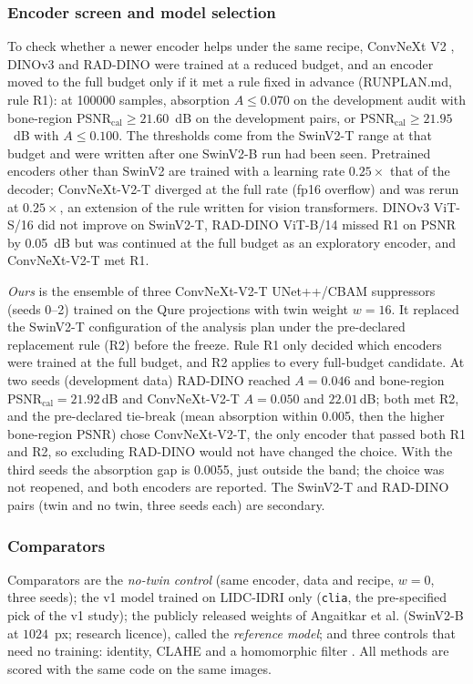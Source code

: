 \subsubsection{Encoder screen and model selection}
\label{sec:m-encoders}
To check whether a newer encoder helps under the same recipe, ConvNeXt V2 \cite{woo2023convnextv2}, DINOv3 \cite{simeoni2025dinov3} and
RAD-DINO \cite{perezgarcia2025raddino} were trained at a reduced budget, and an encoder moved to the full budget only if it met a rule fixed
in advance (RUNPLAN.md, rule R1): at \num{100000} samples, absorption $A\le0.070$ on the development audit with bone-region
PSNR$_{\mathrm{cal}}\ge21.60$~dB on the development pairs, or PSNR$_{\mathrm{cal}}\ge21.95$~dB with $A\le0.100$. The thresholds come from
the SwinV2-T range at that budget and were written after one SwinV2-B run had been seen. Pretrained encoders other than SwinV2 are trained
with a learning rate $0.25\times$ that of the decoder; ConvNeXt-V2-T diverged at the full rate (fp16 overflow) and was rerun at $0.25\times$,
an extension of the rule written for vision transformers. DINOv3 ViT-S/16 did not improve on SwinV2-T, RAD-DINO ViT-B/14 missed R1 on PSNR
by 0.05~dB but was continued at the full budget as an exploratory encoder, and ConvNeXt-V2-T met R1.

\emph{Ours} is the ensemble of three ConvNeXt-V2-T UNet++/CBAM suppressors (seeds 0--2) trained on the Qure projections with twin weight
$w=16$. It replaced the SwinV2-T configuration of the analysis plan under the pre-declared replacement rule (R2) before the freeze. Rule R1
only decided which encoders were trained at the full budget, and R2 applies to every full-budget candidate. At two seeds (development data)
RAD-DINO reached $A=0.046$ and bone-region PSNR$_{\mathrm{cal}}=21.92$\,dB and ConvNeXt-V2-T $A=0.050$ and $22.01$\,dB; both met R2, and
the pre-declared tie-break (mean absorption within 0.005, then the higher bone-region PSNR) chose ConvNeXt-V2-T, the only encoder that
passed both R1 and R2, so excluding RAD-DINO would not have changed the choice. With the third seeds the absorption gap is 0.0055, just
outside the band; the choice was not reopened, and both encoders are reported. The SwinV2-T and RAD-DINO pairs (twin and no twin, three
seeds each) are secondary.

\subsubsection{Comparators}
Comparators are the \emph{no-twin control} (same encoder, data and recipe, $w=0$, three seeds); the v1 model trained on LIDC-IDRI only
(\texttt{clia}, the pre-specified pick of the v1 study); the publicly released weights of Angaitkar et al. \cite{angaitkar2026anatomy}
(SwinV2-B at $1024$~px; research licence), called the \emph{reference model}; and three controls that need no training: identity, CLAHE
\cite{zuiderveld1994clahe} and a homomorphic filter \cite{oppenheim1968homomorphic}. All methods are scored with the same code on the same
images.

